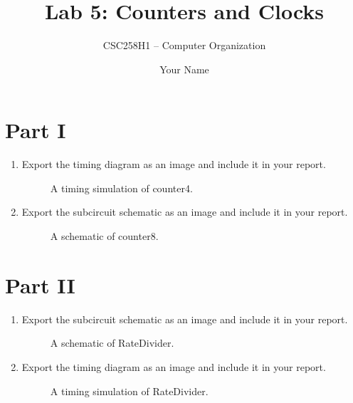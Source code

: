 \documentclass[parskip=half]{scrarticle}
\title{Lab 5: Counters and Clocks}
\subtitle{CSC258H1 -- Computer Organization}
\author{Your Name}
\begin{document}
\maketitle

\section*{Part I}

\begin{enumerate}
\item Export the timing diagram as an image and include it in your report.

\begin{figure}[ht!]
    \centering
    \caption{A timing simulation of counter4.}
    \label{f:counter4_timing}
\end{figure}

\item Export the subcircuit schematic as an image and include it in your report.

\begin{figure}[ht!]
    \centering
    \caption{A schematic of counter8.}
    \label{f:counter8}
\end{figure}
\end{enumerate}

\section*{Part II}

\begin{enumerate}
\item Export the subcircuit schematic as an image and include it in your report.

\begin{figure}[ht!]
    \centering
    \caption{A schematic of RateDivider.}
    \label{f:rate_divider}
\end{figure}

\item Export the timing diagram as an image and include it in your report.

\begin{figure}[ht!]
    \centering
    \caption{A timing simulation of RateDivider.}
    \label{f:rate_divider_timing}
\end{figure}
\end{enumerate}
\end{document}
